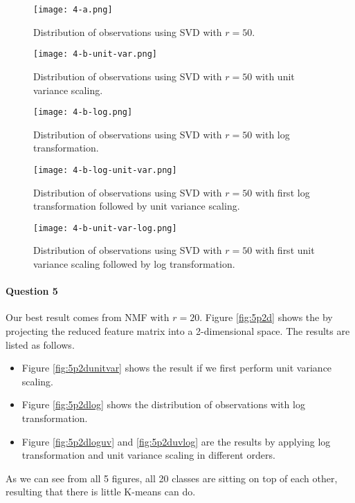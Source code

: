 \begin{figure}[H]
	\centering
	\texttt{[image: 4-a.png]}
	\caption{Distribution of observations using SVD with $r=50$.}
	\label{fig:p2d}
\end{figure}

\begin{figure}[H]
	\centering
	\texttt{[image: 4-b-unit-var.png]}
	\caption{Distribution of observations using SVD with $r=50$ with unit variance scaling.}
	\label{fig:p2dunitvar}
\end{figure}

\begin{figure}[H]
	\centering
	\texttt{[image: 4-b-log.png]}
	\caption{Distribution of observations using SVD with $r=50$ with log transformation.}
	\label{fig:p2dlog}
\end{figure}

\begin{figure}[H]
	\centering
	\texttt{[image: 4-b-log-unit-var.png]}
	\caption{Distribution of observations using SVD with $r=50$ with first log transformation followed by unit variance scaling.}
	\label{fig:p2dloguv}
\end{figure}

\begin{figure}[H]
	\centering
	\texttt{[image: 4-b-unit-var-log.png]}
	\caption{Distribution of observations using SVD with $r=50$ with first unit variance scaling followed by log transformation.}
	\label{fig:p2duvlog}
\end{figure}
\paragraph{Question 5}
Our best result comes from NMF with $r=20$. Figure \ref{fig:5p2d} shows the by projecting the reduced feature matrix into a 2-dimensional space. The results are listed as follows.
\begin{itemize}
	\setlength{\itemsep}{0pt}
	\item Figure \ref{fig:5p2dunitvar} shows the result if we first perform unit variance scaling. 
	\item Figure \ref{fig:5p2dlog} shows the distribution of observations with log transformation.
	\item Figure \ref{fig:5p2dloguv} and \ref{fig:5p2duvlog} are the results by applying log transformation and unit variance scaling in different orders.
\end{itemize}
As we can see from all 5 figures, all 20 classes are sitting on top of each other, resulting that there is little K-means can do.


